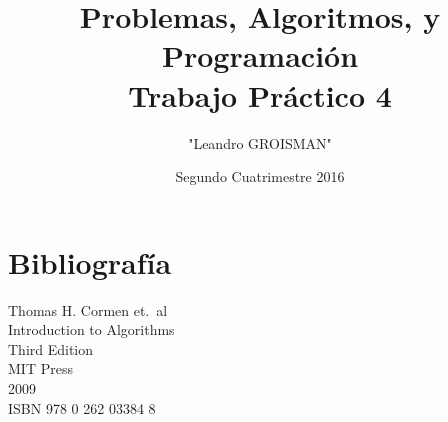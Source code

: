\documentclass{article}
\title{Problemas, Algoritmos, y Programación \\ Trabajo Práctico 4}
\author{"Leandro GROISMAN"}
\date{Segundo Cuatrimestre 2016}
\begin{document}
\maketitle{}

\newpage
\tableofcontents






\section{Bibliografía}

\begin{thebibliography}{9}

	Thomas H. Cormen et.\ al \\
	Introduction to Algorithms \\
	Third Edition \\
	MIT Press \\
	2009 \\
	ISBN 978 0 262 03384 8

\end{thebibliography}
\end{document}
